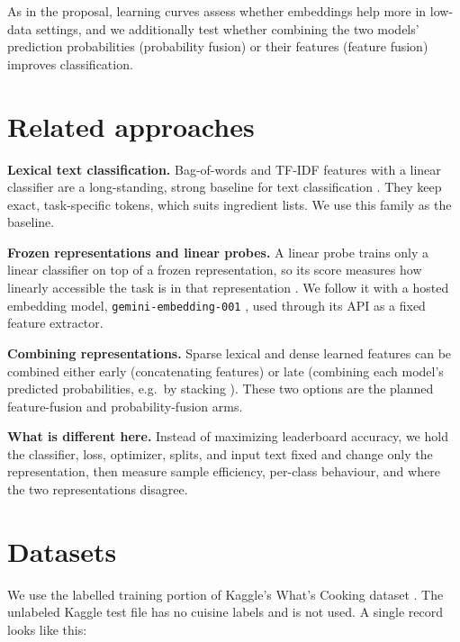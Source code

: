 \documentclass[11pt,letterpaper]{article}
\newcommand{\tfidf}{TF-IDF}
\begin{document}
As in the proposal, learning curves assess whether embeddings help more in low-data settings, and we additionally test whether combining the two models' prediction probabilities (probability fusion) or their features (feature fusion) improves classification.

\section{Related approaches}
\textbf{Lexical text classification.} Bag-of-words and \tfidf{} features with a linear classifier are a long-standing, strong baseline for text classification \cite{joachims}. They keep exact, task-specific tokens, which suits ingredient lists. We use this family as the baseline.

\textbf{Frozen representations and linear probes.} A linear probe trains only a linear classifier on top of a frozen representation, so its score measures how linearly accessible the task is in that representation \cite{alainbengio}. We follow it with a hosted embedding model, \texttt{gemini-embedding-001} \cite{gemini}, used through its API as a fixed feature extractor.

\textbf{Combining representations.} Sparse lexical and dense learned features can be combined either early (concatenating features) or late (combining each model's predicted probabilities, e.g.\ by stacking \cite{stacking}). These two options are the planned feature-fusion and probability-fusion arms.

\textbf{What is different here.} Instead of maximizing leaderboard accuracy, we hold the classifier, loss, optimizer, splits, and input text fixed and change only the representation, then measure sample efficiency, per-class behaviour, and where the two representations disagree.

\section{Datasets}
We use the labelled training portion of Kaggle's What's Cooking dataset \cite{whatscooking}. The unlabeled Kaggle test file has no cuisine labels and is not used. A single record looks like this:

\begin{center}
\small
{}
\end{center}
\end{document}
